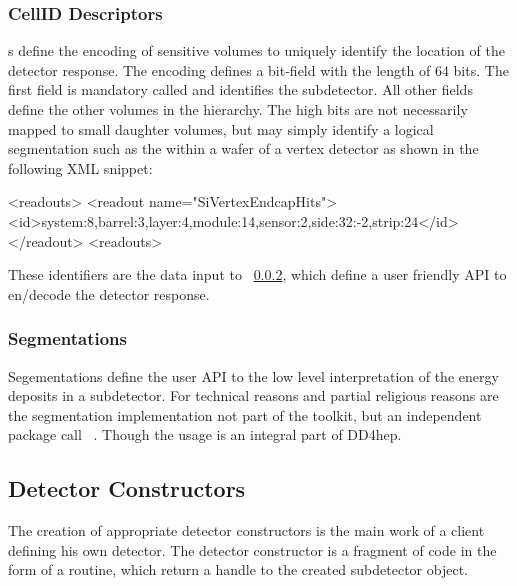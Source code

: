\documentclass[10pt,a4paper]{article}
\begin{document}
\subsubsection{CellID Descriptors}
\label{sec:dd4hep-manual-readout-iddescriptors}
\noindent
{}s define the encoding of sensitive volumes to uniquely identify
the location of the detector response. The encoding defines a bit-field with
the length of 64 bits. The first field is mandatory called  and 
identifies the subdetector. All other fields define the other volumes in the 
hierarchy. The high bits are not necessarily mapped to small daughter volumes,
but may simply identify a logical segmentation such as the  
within a wafer of a vertex detector as shown in the following XML snippet:
\begin{code}
<readouts>
  <readout name="SiVertexEndcapHits">
    <id>system:8,barrel:3,layer:4,module:14,sensor:2,side:32:-2,strip:24</id>
  </readout>
<readouts>
\end{code}
These identifiers are the data input to 
~\ref{sec:dd4hep-manual-readout-segmentations},
which define a user friendly API to en/decode the detector response.

\subsubsection{Segmentations}
\label{sec:dd4hep-manual-readout-segmentations}
\noindent
Segementations define the user API to the low level interpretation of
the energy deposits in a subdetector. For technical reasons and partial
religious reasons are the segmentation implementation not part of the \DDhep 
toolkit, but an independent package call 
~\cite{bib:DDSegmentations}. Though the usage is an 
integral part of DD4hep.

\newpage
\subsection{Detector Constructors}
\label{sec:dd4hep-manual-detector-constructors}
\noindent
The creation of appropriate detector constructors is the main work of a client
defining his own detector. The detector constructor is a fragment of code in the 
form of a routine, which return a handle to the created subdetector 
 object.
\end{document}
